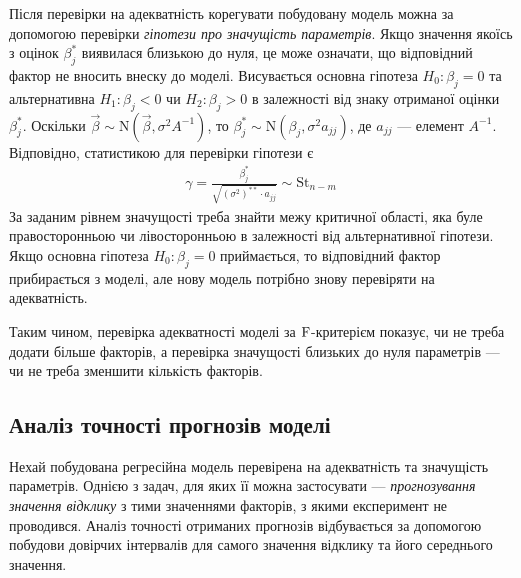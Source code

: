 Після перевірки на адекватність корегувати побудовану модель можна за допомогою перевірки \emph{гіпотези
про значущість параметрів}. Якщо значення якоїсь з оцінок $\beta_j^*$ виявилася близькою до нуля,
це може означати, що відповідний фактор не вносить внеску до моделі.
Висувається основна гіпотеза $H_0 : \beta_j = 0$ та альтернативна $H_1 : \beta_j < 0$ чи
$H_2 : \beta_j > 0$ в залежності від знаку отриманої оцінки $\beta_j^*$.
Оскільки $\vec{\beta} \sim \mathrm{N}(\vec{\beta}, \sigma^2 A^{-1})$,
то $\beta_j^* \sim \mathrm{N}(\beta_j, \sigma^2 a_{jj})$, де $a_{jj}$ --- елемент $A^{-1}$. Відповідно,
статистикою для перевірки гіпотези є 
\begin{gather}\label{signif_test}
    \gamma = 
    \frac{\beta_j^* }{\sqrt{(\sigma^2)^{**} \cdot a_{jj}}} \sim \mathrm{St}_{n-m}
\end{gather}
За заданим рівнем значущості треба знайти межу критичної області, яка буле правосторонньою чи лівосторонньою в залежності
від альтернативної гіпотези. Якщо основна гіпотеза $H_0 : \beta_j = 0$ приймається, то
відповідний фактор прибирається з моделі, але нову модель потрібно знову перевіряти на адекватність.

Таким чином, перевірка адекватності моделі за $\rm F$-критерієм показує,
чи не треба додати більше факторів, а перевірка значущості близьких до нуля параметрів ---
чи не треба зменшити кількість факторів.

\subsection{Аналіз точності прогнозів моделі}
Нехай побудована регресійна модель перевірена на адекватність та значущість параметрів.
Однією з задач, для яких її можна застосувати --- \emph{прогнозування значення відклику}
з тими значеннями факторів, з якими експеримент не проводився.
Аналіз точності отриманих прогнозів відбувається за допомогою побудови
довірчих інтервалів для самого значення відклику та його середнього значення.

